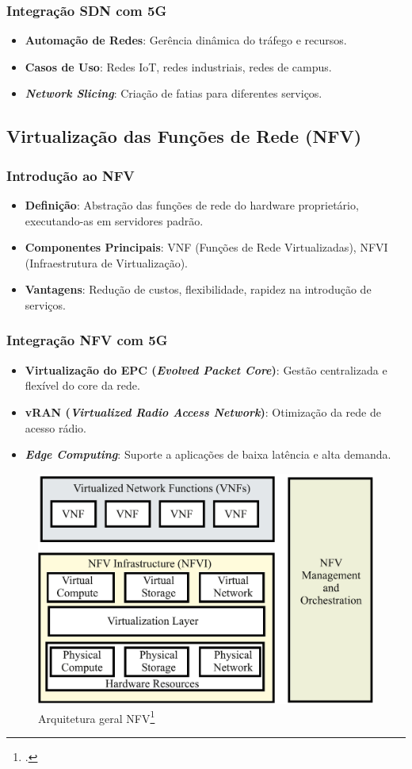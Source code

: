 \begin{frame}
    \frametitle{Integração SDN com 5G}
    \begin{itemize}
        \item \textbf{Automação de Redes}: Gerência dinâmica do tráfego e recursos.
        \item \textbf{Casos de Uso}: Redes IoT, redes industriais, redes de campus.
        \item \textbf{\textit{Network Slicing}}: Criação de fatias para diferentes serviços.
    \end{itemize}
\end{frame}

\subsection{Virtualização das Funções de Rede (NFV)}
\begin{frame}
    \frametitle{Introdução ao NFV}
    \begin{itemize}
        \item \textbf{Definição}: Abstração das funções de rede do hardware proprietário, executando-as em servidores padrão.
        \item \textbf{Componentes Principais}: VNF (Funções de Rede Virtualizadas), NFVI (Infraestrutura de Virtualização).
        \item \textbf{Vantagens}: Redução de custos, flexibilidade, rapidez na introdução de serviços.
    \end{itemize}
\end{frame}

\begin{frame}
    \frametitle{Integração NFV com 5G}
    \begin{itemize}
        \item \textbf{Virtualização do EPC (\textit{Evolved Packet Core})}: Gestão centralizada e flexível do core da rede.
        \item \textbf{vRAN (\textit{Virtualized Radio Access Network})}: Otimização da rede de acesso rádio.
        \item \textbf{\textit{Edge Computing}}: Suporte a aplicações de baixa latência e alta demanda.
    \end{itemize}
    \begin{figure}
        \centering
        \includegraphics[width=0.45\linewidth]{figs/ArquiteturaNFV.png}
        \caption{Arquitetura geral NFV\footcite{NFV_architecture}}
    \end{figure}
\end{frame}

